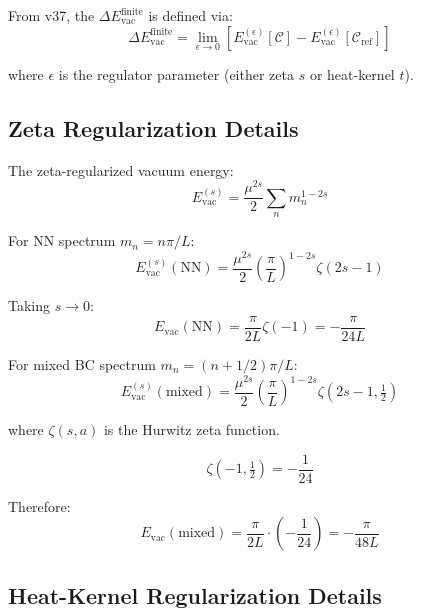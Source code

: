 \documentclass[11pt,a4paper]{article}
\begin{document}
From v37, the $\Delta E_{\text{vac}}^{\text{finite}}$ is defined via:
\begin{equation}
\label{eq:v37-protocol}
\Delta E_{\text{vac}}^{\text{finite}} = \lim_{\epsilon \to 0} \left[E_{\text{vac}}^{(\epsilon)}[\mathcal{C}] - E_{\text{vac}}^{(\epsilon)}[\mathcal{C}_{\text{ref}}]\right]
\end{equation}

where $\epsilon$ is the regulator parameter (either zeta $s$ or heat-kernel $t$).

\subsection{Zeta Regularization Details}

The zeta-regularized vacuum energy:
\begin{equation}
\label{eq:zeta-reg-def}
E_{\text{vac}}^{(s)} = \frac{\mu^{2s}}{2} \sum_n m_n^{1-2s}
\end{equation}

For NN spectrum $m_n = n\pi/L$:
\begin{equation}
\label{eq:zeta-NN}
E_{\text{vac}}^{(s)}(\text{NN}) = \frac{\mu^{2s}}{2} \left(\frac{\pi}{L}\right)^{1-2s} \zeta(2s-1)
\end{equation}

Taking $s \to 0$:
\begin{equation}
\label{eq:zeta-s0}
E_{\text{vac}}(\text{NN}) = \frac{\pi}{2L} \zeta(-1) = -\frac{\pi}{24L}
\end{equation}

For mixed BC spectrum $m_n = (n+1/2)\pi/L$:
\begin{equation}
\label{eq:zeta-mixed}
E_{\text{vac}}^{(s)}(\text{mixed}) = \frac{\mu^{2s}}{2} \left(\frac{\pi}{L}\right)^{1-2s} \zeta(2s-1, \tfrac{1}{2})
\end{equation}

where $\zeta(s, a)$ is the Hurwitz zeta function.

\begin{equation}
\label{eq:hurwitz-m1}
\zeta(-1, \tfrac{1}{2}) = -\frac{1}{24}
\end{equation}

Therefore:
\begin{equation}
\label{eq:zeta-mixed-result}
E_{\text{vac}}(\text{mixed}) = \frac{\pi}{2L} \cdot (-\frac{1}{24}) = -\frac{\pi}{48L}
\end{equation}

\subsection{Heat-Kernel Regularization Details}
\end{document}
